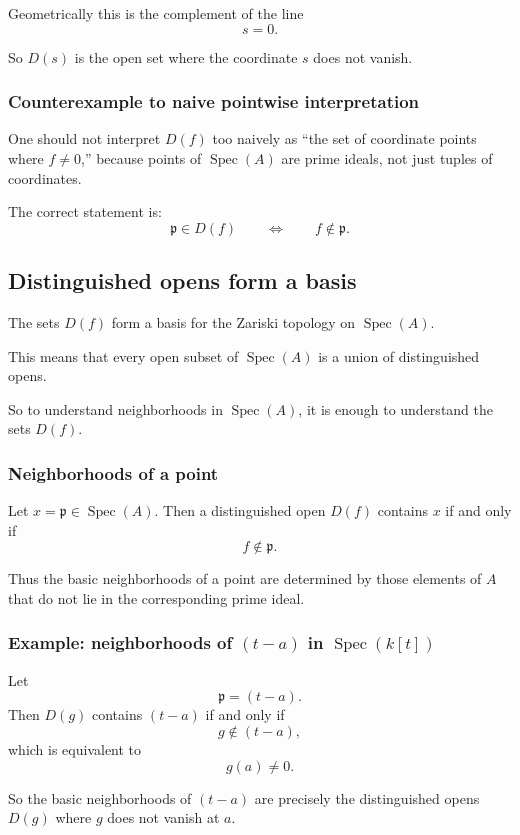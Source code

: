\documentclass[12pt,a4paper]{article}
\theoremstyle{notespace}
\newcommand{\Spec}{\operatorname{Spec}}
\newcommand{\mf}{\mathfrak}
\theoremstyle{definition}
\begin{document}
Geometrically this is the complement of the line
\[
s=0.
\]

So \(D(s)\) is the open set where the coordinate \(s\) does not vanish.

\subsubsection{Counterexample to naive pointwise interpretation}

One should not interpret \(D(f)\) too naively as ``the set of coordinate points where \(f\neq 0\),'' because points of \(\Spec(A)\) are prime ideals, not just tuples of coordinates.

The correct statement is:
\[
\mf p\in D(f)
\qquad\Longleftrightarrow\qquad
f\notin \mf p.
\]

\subsection{Distinguished opens form a basis}

The sets \(D(f)\) form a basis for the Zariski topology on \(\Spec(A)\).

This means that every open subset of \(\Spec(A)\) is a union of distinguished opens.

So to understand neighborhoods in \(\Spec(A)\), it is enough to understand the sets \(D(f)\).

\subsubsection{Neighborhoods of a point}

Let \(x=\mf p\in \Spec(A)\). Then a distinguished open \(D(f)\) contains \(x\) if and only if
\[
f\notin \mf p.
\]

Thus the basic neighborhoods of a point are determined by those elements of \(A\) that do not lie in the corresponding prime ideal.

\subsubsection{Example: neighborhoods of \((t-a)\) in \(\Spec(k[t])\)}

Let
\[
\mf p=(t-a).
\]
Then \(D(g)\) contains \((t-a)\) if and only if
\[
g\notin (t-a),
\]
which is equivalent to
\[
g(a)\neq 0.
\]

So the basic neighborhoods of \((t-a)\) are precisely the distinguished opens \(D(g)\) where \(g\) does not vanish at \(a\).
\end{document}
